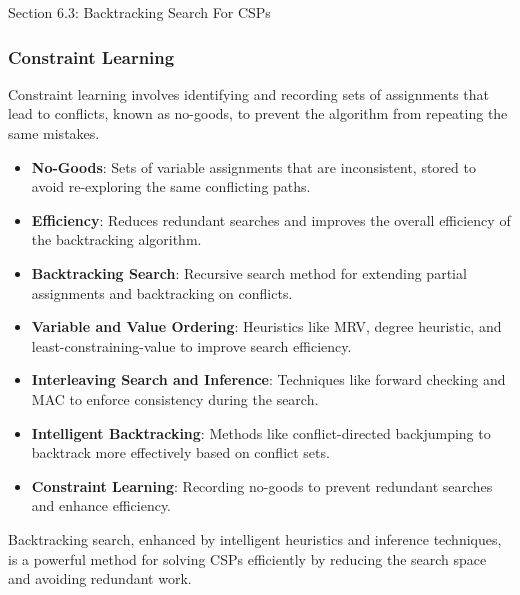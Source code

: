 \begin{notes}{Section 6.3: Backtracking Search For CSPs}
\begin{highlight}
    \end{highlight}
    
    \subsubsection*{Constraint Learning}
    
    Constraint learning involves identifying and recording sets of assignments that lead to conflicts, known as no-goods, to prevent the algorithm from repeating the same mistakes.
    
    \begin{highlight}
    
        \begin{itemize}
            \item \textbf{No-Goods}: Sets of variable assignments that are inconsistent, stored to avoid re-exploring the same conflicting paths.
            \item \textbf{Efficiency}: Reduces redundant searches and improves the overall efficiency of the backtracking algorithm.
        \end{itemize}
    
    \end{highlight}
    
    \begin{highlight}
    
        \begin{itemize}
            \item \textbf{Backtracking Search}: Recursive search method for extending partial assignments and backtracking on conflicts.
            \item \textbf{Variable and Value Ordering}: Heuristics like MRV, degree heuristic, and least-constraining-value to improve search efficiency.
            \item \textbf{Interleaving Search and Inference}: Techniques like forward checking and MAC to enforce consistency during the search.
            \item \textbf{Intelligent Backtracking}: Methods like conflict-directed backjumping to backtrack more effectively based on conflict sets.
            \item \textbf{Constraint Learning}: Recording no-goods to prevent redundant searches and enhance efficiency.
        \end{itemize}
    
        Backtracking search, enhanced by intelligent heuristics and inference techniques, is a powerful method for solving CSPs efficiently by reducing the search space and avoiding redundant work.
    
    \end{highlight}
\end{notes}

